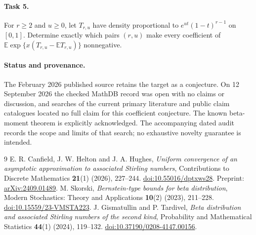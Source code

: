\documentclass[11pt]{article}
\newcommand{\E}{\mathbb E}
\begin{document}
\paragraph{Task 5.}
For $r\geq2$ and $u\geq0$, let $T_{r,u}$ have density proportional to
$e^{ut}(1-t)^{r-1}$ on $[0,1]$. Determine exactly which pairs $(r,u)$
make every coefficient of
$\E\exp\{x(T_{r,u}-\E T_{r,u})\}$ nonnegative.

\paragraph{Status and provenance.}
The February 2026 published source retains the target as a conjecture.
On 12 September 2026 the checked MathDB record was open with no claims
or discussion, and searches of the current primary literature and
public claim catalogues located no full claim for this coefficient
conjecture. The known beta-moment theorem is explicitly acknowledged.
The accompanying dated audit records the scope and limits of that
search; no exhaustive novelty guarantee is intended.

\begin{thebibliography}{9}
E. R. Canfield, J. W. Helton and J. A. Hughes,
\emph{Uniform convergence of an asymptotic approximation to associated
Stirling numbers}, Contributions to Discrete Mathematics
\textbf{21}(1) (2026), 227--244.
\href{https://doi.org/10.55016/dptxws28}{doi:10.55016/dptxws28}.
Preprint: \href{https://arxiv.org/abs/2409.01489}{arXiv:2409.01489}.
M. Skorski, \emph{Bernstein-type bounds for beta distribution},
Modern Stochastics: Theory and Applications \textbf{10}(2) (2023),
211--228.
\href{https://doi.org/10.15559/23-VMSTA223}{doi:10.15559/23-VMSTA223}.
J. Gismatullin and P. Tardivel,
\emph{Beta distribution and associated Stirling numbers of the second kind},
Probability and Mathematical Statistics \textbf{44}(1) (2024), 119--132.
\href{https://doi.org/10.37190/0208-4147.00156}{doi:10.37190/0208-4147.00156}.
\end{thebibliography}
\end{document}

